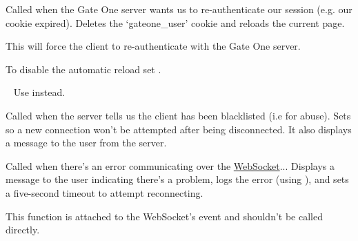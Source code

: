 \documentclass[letterpaper,10pt,openany]{sphinxmanual}
\begin{document}
\begin{fulllineitems}
\begin{fulllineitems}
\begin{fulllineitems}
\label{Developer/js_gateone:GateOne.Net.reauthenticate}
Called when the Gate One server wants us to re-authenticate our session (e.g. our cookie expired).  Deletes the `gateone\_user' cookie and reloads the current page.

This will force the client to re-authenticate with the Gate One server.

To disable the automatic reload set .

\end{fulllineitems}



\begin{fulllineitems}
\label{Developer/js_gateone:GateOne.Net.sendDimensions}~
Use {\hyperref[Applications/terminal/js_terminal:GateOne.Terminal.sendDimensions]{}} instead.

\end{fulllineitems}



\begin{fulllineitems}
\label{Developer/js_gateone:GateOne.Net.blacklisted}
Called when the server tells us the client has been blacklisted (i.e for abuse).  Sets  so a new connection won't be attempted after being disconnected.  It also displays a message to the user from the server.

\end{fulllineitems}



\begin{fulllineitems}
\label{Developer/js_gateone:GateOne.Net.connectionError}
Called when there's an error communicating over the \href{https://developer.mozilla.org/en/WebSockets/WebSockets\_reference/WebSocket}{WebSocket}...  Displays a message to the user indicating there's a problem, logs the error (using ), and sets a five-second timeout to attempt reconnecting.

This function is attached to the WebSocket's  event and shouldn't be called directly.


\end{fulllineitems}
\end{fulllineitems}
\end{fulllineitems}
\end{document}
